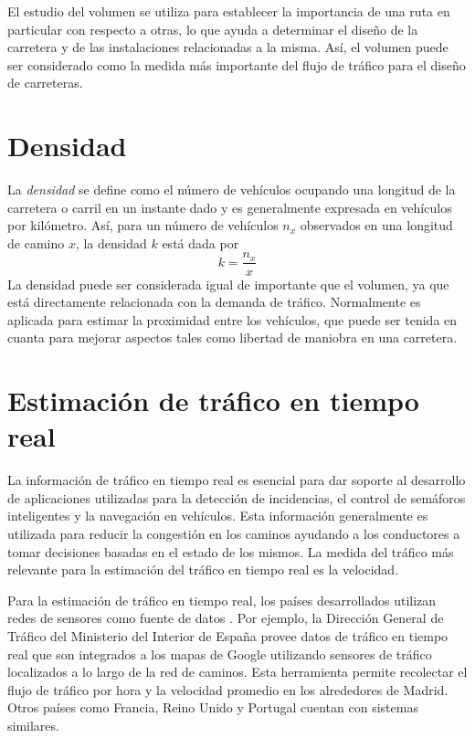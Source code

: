 El estudio del volumen se utiliza para establecer la importancia de una ruta en particular con respecto a otras, lo que ayuda a determinar el diseño de la carretera y de las instalaciones relacionadas a la misma. Así, el volumen puede ser considerado como la medida más importante del flujo de tráfico para el diseño de carreteras.

\section{Densidad}

La \emph{densidad} se define como el número de vehículos ocupando una longitud de la carretera o carril en un instante dado y es generalmente expresada en vehículos por kilómetro. Así, para un número de vehículos $n_{x}$ observados en una longitud de camino $x$, la densidad $k$ está dada por
\begin{equation}
k=\frac { { n }_{ x } }{ x }
\end{equation}
La densidad puede ser considerada igual de importante que el volumen, ya que está directamente relacionada con la demanda de tráfico. Normalmente es aplicada para estimar la proximidad entre los vehículos, que puede ser tenida en cuanta para mejorar aspectos tales como libertad de maniobra en una carretera.

\section{Estimación de tráfico en tiempo real}

La información de tráfico en tiempo real es esencial para dar soporte al desarrollo de aplicaciones utilizadas para la detección de incidencias, el control de semáforos inteligentes y la navegación en vehículos. Esta información generalmente es utilizada para reducir la congestión en los caminos ayudando a los conductores a tomar decisiones basadas en el estado de los mismos. La medida del tráfico más relevante para la estimación del tráfico en tiempo real es la velocidad.

Para la estimación de tráfico en tiempo real, los países desarrollados utilizan redes de sensores como fuente de datos \citep{leduc2008road}. Por ejemplo, la Dirección General de Tráfico del Ministerio del Interior de España provee datos de tráfico en tiempo real que son  integrados a los mapas de Google utilizando sensores de tráfico localizados a lo largo de la red de caminos. Esta herramienta permite recolectar el flujo de tráfico por hora y la velocidad promedio en los alrededores de Madrid. Otros países como Francia, Reino Unido y Portugal cuentan con sistemas similares.

